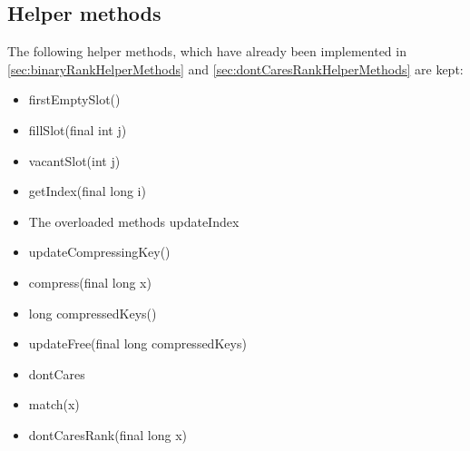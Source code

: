 \subsection{Helper methods} \label{sec:dontCaresInsertHelperMethods}

The following helper methods, which have already been implemented in \ref{sec:binaryRankHelperMethods} and \ref{sec:dontCaresRankHelperMethods} are kept:
\begin{itemize}
    \item
    {\ttfamily firstEmptySlot()}
    
    \item
    {\ttfamily fillSlot(final int j)}
    
    \item
    {\ttfamily vacantSlot(int j)}
    
    \item
    {\ttfamily getIndex(final long i)}
    
    \item
    The overloaded methods {\ttfamily updateIndex}
    
    \item
    {\ttfamily updateCompressingKey()}
    
    \item
    {\ttfamily compress(final long x)}
    
    \item
    {\ttfamily long compressedKeys()}
    
    \item
    {\ttfamily updateFree(final long compressedKeys)}
    
    \item
    {\ttfamily dontCares}
    
    \item
    {\ttfamily match(x)}
    
    \item
    {\ttfamily dontCaresRank(final long x)}
    
\end{itemize}

